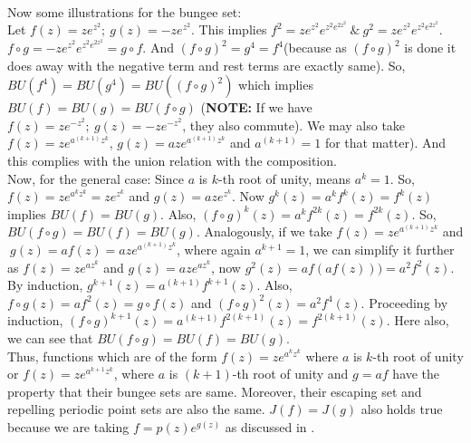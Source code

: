 \documentclass[a4paper,12pt]{amsart}
\numberwithin{equation}{section}
\begin{document}
\\
Now some illustrations for the bungee set:\\
Let $f(z)=ze^{z^2};\ g(z)=-ze^{z^2}.$ This implies $f^2=ze^{z^2}e^{z^2e^{2z^2}} \ \& \ g^2=ze^{z^2}e^{z^2e^{2z^2}}.$
$f \circ g = -ze^{z^2}e^{z^2e^{2z^2}} = g \circ f$. And $(f\circ g)^2=g^4=f^4$(because as $(f \circ g)^2$ is done it does away with the negative term and rest terms are exactly same). So, $BU(f^4)=BU(g^4)=BU((f \circ g)^2)$ which implies $BU(f)=BU(g)=BU(f \circ g)$ (\textbf{NOTE:} If we have $f(z)=ze^{-z^2};\ g(z)=-ze^{-z^2}$, they also commute). We may also  take $f(z)=ze^{a^{(k+1)}z^k}$, $g(z)=aze^{a^{(k+1)}z^k}$ and $a^{(k+1)}=1$ for that matter). And this complies with the union relation with the composition.\\
Now, for the general case: Since $a$ is $k$-th root of unity, means $a^k=1$. So, $f(z)=ze^{a^k z^k}=ze^{z^k}$ and $g(z)=aze^{z^k}$. Now $g^k(z)=a^k  f^k(z)=f^k(z)$ implies $BU(f)=BU(g)$. Also, $(f \circ g)^{k}(z)=a^{k}f^{2k}(z)=f^{2k}(z)$. So, $BU(f \circ g)=BU(f)=BU(g)$. Analogously, if we take $f(z)=ze^{a^{(k+1)}z^k}$ and $\ g(z)=af(z)=aze^{a^{(k+1)}z^k}$, where again $a^{k+1}=1$, we can simplify it further as $f(z)=ze^{az^k}$ and $g(z)=aze^{az^k}$, now $g^2(z)=af(af(z)))=a^2f^2(z)$. By induction,  $g^{k+1}(z)=a^{(k+1)}f^{k+1}(z)$. Also, $f \circ g(z)= af^2(z)=g \circ f(z)$ and $(f \circ g)^2(z)=a^2f^4(z)$. Proceeding by induction, $(f \circ g)^{k+1}(z)=a^{(k+1)}f^{2(k+1)}(z)=f^{2(k+1)}(z)$. Here also, we can see that $BU(f\circ g)= BU(f)=BU(g)$.\\
Thus, functions which are of the form $f(z)=ze^{a^k z^k}$ where $a$ is $k$-th root of unity or $f(z)=ze^{a^{k+1} z^k}$, where $a$ is $(k+1)$-th root of unity and $g=af$  have the property that their bungee sets are same. Moreover, their escaping set and repelling periodic point sets are also the same. $J(f)=J(g)$ also holds true  because we are taking  $f= p(z)e^{g(z)}$ as discussed in \cite{tw}. 
\end{document}
